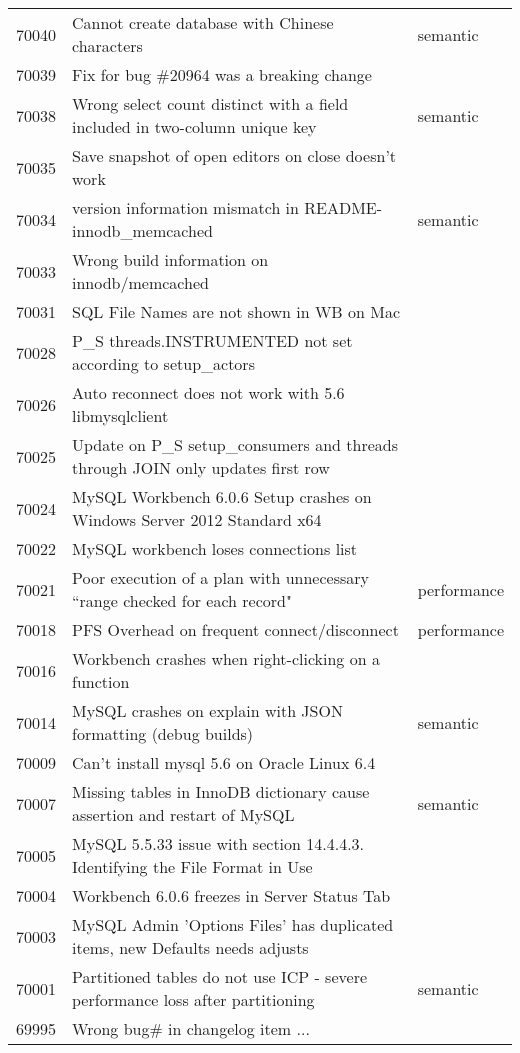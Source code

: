 \begin{longtable}[c]{p{1cm}p{8cm}p{3cm}}
70040 & Cannot create database with Chinese characters & semantic \\
70039 & Fix for bug \#20964 was a breaking change &  \\
70038 & Wrong select count distinct with a field included in two-column unique key & semantic \\
70035 & Save snapshot of open editors on close doesn't work &  \\
70034 & version information mismatch in README-innodb\_memcached & semantic \\
70033 & Wrong build information on innodb/memcached &  \\
70031 & SQL File Names are not shown in WB on Mac &  \\
70028 & P\_S threads.INSTRUMENTED not set according to setup\_actors &  \\
70026 & Auto reconnect does not work with 5.6 libmysqlclient &  \\
70025 & Update on P\_S setup\_consumers and threads through JOIN only updates first row &  \\
70024 & MySQL Workbench 6.0.6 Setup crashes on Windows Server 2012 Standard x64 &  \\
70022 & MySQL workbench loses connections list &  \\
70021 & Poor execution of a plan with unnecessary ``range checked for each record" & performance \\
70018 & PFS Overhead on frequent connect/disconnect & performance \\
70016 & Workbench crashes when right-clicking on a function &  \\
70014 & MySQL crashes on explain with JSON formatting (debug builds) & semantic \\
70009 & Can't install mysql 5.6 on Oracle Linux 6.4 &  \\
70007 & Missing tables in InnoDB dictionary cause assertion and restart of MySQL & semantic \\
70005 & MySQL 5.5.33 issue with section 14.4.4.3. Identifying the File Format in Use &  \\
70004 & Workbench 6.0.6 freezes in Server Status Tab &  \\
70003 & MySQL Admin 'Options Files' has duplicated items, new Defaults needs adjusts &  \\
70001 & Partitioned tables do not use ICP - severe performance loss after partitioning & semantic \\
69995 & Wrong bug\# in changelog item ... &  \\

\end{longtable}
